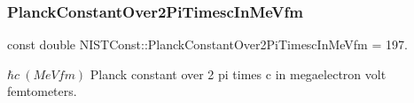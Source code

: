 \subsubsection{\texorpdfstring{Planck\+Constant\+Over2\+Pi\+Timesc\+In\+Me\+Vfm}{PlanckConstantOver2PiTimescInMeVfm}}
{\footnotesize\ttfamily const double N\+I\+S\+T\+Const\+::\+Planck\+Constant\+Over2\+Pi\+Timesc\+In\+Me\+Vfm = 197.}

$\hbar c \ (MeV fm)$ Planck constant over 2 pi times c in megaelectron volt femtometers. 